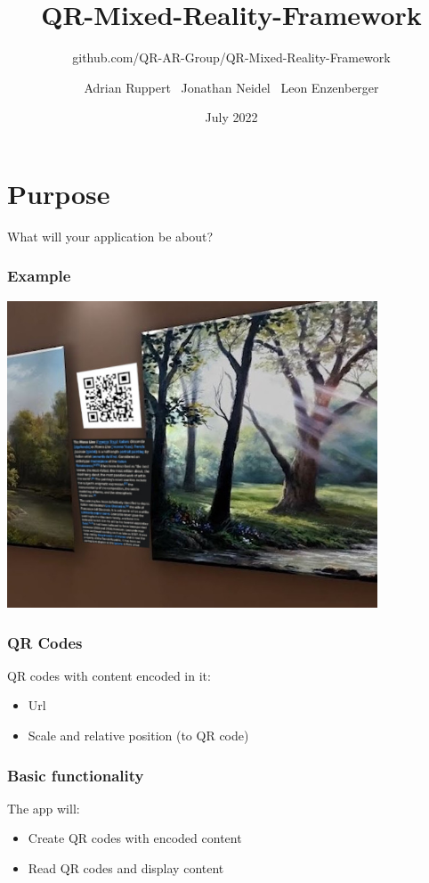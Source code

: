 \documentclass{beamer}
\title{QR-Mixed-Reality-Framework}
\subtitle{github.com/QR-AR-Group/QR-Mixed-Reality-Framework}
\author{
  Adrian Ruppert \
  Jonathan Neidel \
  Leon Enzenberger
}
\date{July 2022}
\institute{HTW Berlin, Angewandte Informatik, AR Applications and Theoretical Foundations}
\begin{document}
\frame{\titlepage}


\section{Purpose}
\begin{frame}
	\begin{center}
		{\Huge What will your application be about?}
	\end{center}
\end{frame}
\begin{frame}
  \frametitle{Example}
  \includegraphics[width=11cm]{gallery_example}
\end{frame}

\begin{frame}
  \frametitle{QR Codes}
  QR codes with content encoded in it:
  \begin{itemize}
    \item Url
    \item Scale and relative position (to QR code)
  \end{itemize}
\end{frame}

\begin{frame}
  \frametitle{Basic functionality}

  The app will:
  \begin{itemize}
    \item Create QR codes with encoded content
    \item Read QR codes and display content
  \end{itemize}
\end{frame}
\end{document}
